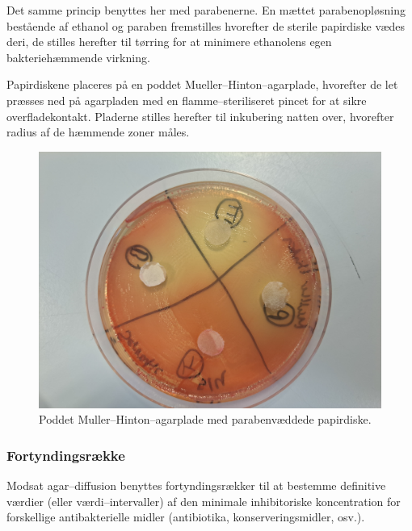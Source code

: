     Det samme princip benyttes her med parabenerne. En mættet parabenopløsning bestående af ethanol og paraben fremstilles hvorefter de sterile papirdiske vædes deri, de stilles herefter til tørring for at minimere ethanolens egen bakteriehæmmende virkning.

    Papirdiskene placeres på en poddet Mueller--Hinton--agarplade, hvorefter de let præsses ned på agarpladen med en flamme--steriliseret pincet for at sikre overfladekontakt. Pladerne stilles herefter til inkubering natten over, hvorefter radius af de hæmmende zoner måles.
    \begin{figure}[H]\centering
        \includegraphics[width=.75\linewidth]{billeder/mhplade}
        \caption{Poddet Muller--Hinton--agarplade med parabenvæddede papirdiske.}
    \end{figure}

    \subsubsection{Fortyndingsrække}
    Modsat agar--diffusion benyttes fortyndingsrækker til at bestemme definitive værdier (eller værdi--intervaller) af den minimale inhibitoriske koncentration for forskellige antibakterielle midler (antibiotika, konserveringsmidler, osv.). 

